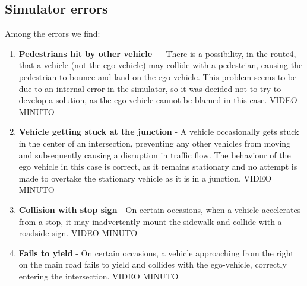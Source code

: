 \documentclass{article}
\begin{document}
\subsection{Simulator errors}
Among the errors we find:
\begin{enumerate}
    \item \textbf{Pedestrians hit by other vehicle} — There is a possibility, in the route4, that a vehicle (not the ego-vehicle) 
    may collide with a pedestrian, causing the pedestrian to bounce and land on the ego-vehicle. This problem seems to be due to 
    an internal error in the simulator, so it was decided not to try to develop a solution, as the ego-vehicle cannot be blamed 
    in this case. VIDEO MINUTO
    \item \textbf{Vehicle getting stuck at the junction} - A vehicle occasionally gets stuck in the center of an intersection, 
    preventing any other vehicles from moving and subsequently causing a disruption in traffic flow.
    The behaviour of the ego vehicle in this case is correct, as it remains stationary and no attempt is made to overtake the 
    stationary vehicle as it is in a junction. VIDEO MINUTO
    \item \textbf{Collision with stop sign} - On certain occasions, when a vehicle accelerates from a stop, it may inadvertently 
    mount the sidewalk and collide with a roadside sign. VIDEO MINUTO
    \item \textbf{Fails to yield} - On certain occasions, a vehicle approaching from the right on the main road fails to yield 
    and collides with the ego-vehicle, correctly entering the intersection. VIDEO MINUTO
\end{enumerate}

\printbibliography
\end{document}
